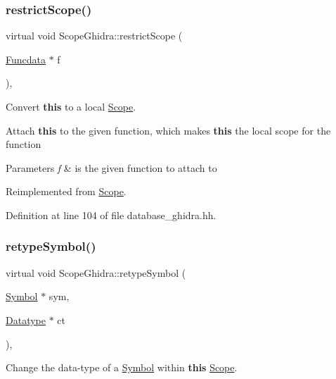 \subsubsection{\texorpdfstring{restrictScope()}{restrictScope()}}
{\footnotesize\ttfamily virtual void Scope\+Ghidra\+::restrict\+Scope (\begin{DoxyParamCaption}\item[{\mbox{\hyperlink{class_funcdata}{Funcdata}} $\ast$}]{f }\end{DoxyParamCaption})\hspace{0.3cm}{\ttfamily [inline]}, {\ttfamily [virtual]}}



Convert {\bfseries{this}} to a local \mbox{\hyperlink{class_scope}{Scope}}. 

Attach {\bfseries{this}} to the given function, which makes {\bfseries{this}} the local scope for the function 
\begin{DoxyParams}{Parameters}
{\em f} & is the given function to attach to \\
\hline
\end{DoxyParams}


Reimplemented from \mbox{\hyperlink{class_scope_a21556c257fbea888f9004c654599dfe9}{Scope}}.



Definition at line 104 of file database\+\_\+ghidra.\+hh.

\mbox{\label{class_scope_ghidra_a086054a08a1916c410fa10b3e8afca76}} 
\subsubsection{\texorpdfstring{retypeSymbol()}{retypeSymbol()}}
{\footnotesize\ttfamily virtual void Scope\+Ghidra\+::retype\+Symbol (\begin{DoxyParamCaption}\item[{\mbox{\hyperlink{class_symbol}{Symbol}} $\ast$}]{sym,  }\item[{\mbox{\hyperlink{class_datatype}{Datatype}} $\ast$}]{ct }\end{DoxyParamCaption})\hspace{0.3cm}{\ttfamily [inline]}, {\ttfamily [virtual]}}



Change the data-\/type of a \mbox{\hyperlink{class_symbol}{Symbol}} within {\bfseries{this}} \mbox{\hyperlink{class_scope}{Scope}}. 

